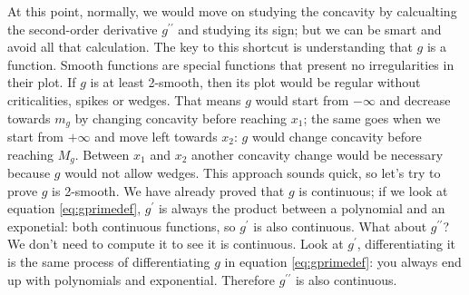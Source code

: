 At this point, normally, we would move on studying
the concavity by calcualting the second-order
derivative $g^{\prime\prime}$ and studying its sign;
but we can be smart and avoid all that calculation.
The key to this shortcut is understanding that $g$ is a
 function. Smooth functions are special functions that present
no irregularities in their plot. If $g$ is at least 2-smooth, then its plot would be regular without
criticalities, spikes or wedges.
That means $g$ would start from $-\infty$ and decrease towards $m_g$ by changing
concavity before reaching $x_1$; the same goes when we start from $+\infty$ and move left towards $x_2$:
$g$ would change concavity before reaching $M_g$. Between $x_1$ and $x_2$ another concavity change would be
necessary because $g$ would not allow wedges. This approach sounds quick, so let's try to
prove $g$ is 2-smooth. We have already proved that $g$ is continuous; if we look at
equation \ref{eq:gprimedef}, $g^\prime$ is always the product between a polynomial and an exponetial:
both continuous functions, so $g^\prime$ is also continuous.
What about $g^{\prime\prime}$? We don't need to compute it to see it is continuous.
Look at $g^\prime$, differentiating it is the same process of
differentiating $g$ in equation \ref{eq:gprimedef}: you always end up with polynomials and exponential.
Therefore $g^{\prime\prime}$ is also continuous.

